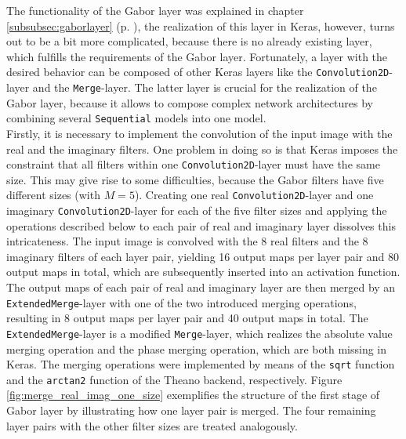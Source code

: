 \documentclass[11pt, a4paper]{article}
\newcommand\myref[1]{\ref{#1} (p. \pageref{#1})}
\begin{document}
\begin{appendix}
The functionality of the Gabor layer was explained in chapter \myref{subsubsec:gaborlayer}, the realization of this layer in Keras, however, turns out to be a bit more complicated, because there is no already existing layer, which fulfills the requirements of the Gabor layer.  Fortunately, a layer with the desired behavior can be composed of other Keras layers like the \texttt{Convolution2D}-layer and the \texttt{Merge}-layer. The latter layer is crucial for the realization of the Gabor layer, because it allows to compose complex network architectures by combining several \texttt{Sequential} models into one model.\\
Firstly, it is necessary to implement the convolution of the input image with the real and the imaginary filters. One problem in doing so is that Keras imposes the constraint that all filters within one \texttt{Convolution2D}-layer must have the same size. This may give rise to some difficulties, because the Gabor filters have five different sizes (with $M = 5$). Creating one real \texttt{Convolution2D}-layer and one imaginary \texttt{Convolution2D}-layer for each of the five filter sizes and applying the operations described below to each pair of real and imaginary layer dissolves this intricateness. The input image is convolved with the 8 real filters and the 8 imaginary filters of each layer pair, yielding 16 output maps per layer pair and 80 output maps in total, which are subsequently inserted into an activation function. The output maps of each pair of  real and imaginary layer are then merged by an \texttt{ExtendedMerge}-layer with one of the two introduced merging operations, resulting in 8 output maps per layer pair and 40 output maps in total. The \texttt{ExtendedMerge}-layer is a modified \texttt{Merge}-layer, which realizes the absolute value merging operation and the phase merging operation, which are both missing in Keras. The merging operations were implemented by means of the \texttt{sqrt} function and the \texttt{arctan2} function of the Theano backend, respectively. Figure \ref{fig:merge_real_imag_one_size} exemplifies the structure of the first stage of Gabor layer by illustrating how one layer pair is merged. The four remaining layer pairs with the other filter sizes are treated analogously.



\end{appendix}
\end{document}
